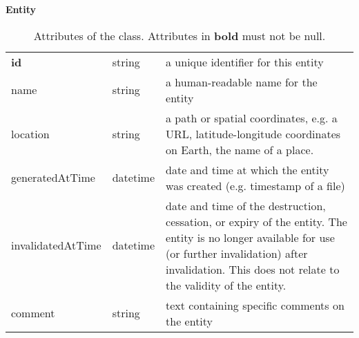 \begin{table}[ht]
\small
{}\textwidth
\textbf{\normalsize Entity}\vspace{0.25em}\\
\begin{tabulary}{1.0\textwidth}{llL}
\toprule
{} &  & \\
\midrule
\textbf{id} & string & a unique identifier for this entity\\
name        & string & a human-readable name for the entity\\
location    & string & a path or spatial coordinates, e.g. a URL, latitude-longitude coordinates on Earth, the name of a place.\\
generatedAtTime  & datetime & date and time at which the entity was created (e.g. timestamp of a file)\\
invalidatedAtTime  & datetime & date and time of the destruction, cessation, or expiry of the entity. The entity is no longer available for use (or further invalidation) after invalidation. This does not relate to the validity of the entity.\\
comment  &  string & text containing specific comments on the entity\\
\bottomrule
\end{tabulary}
\caption[Attributes of the  class]{Attributes of the  class. Attributes in \textbf{bold} must not be null.
}\label{tab:entity}
\end{table}


